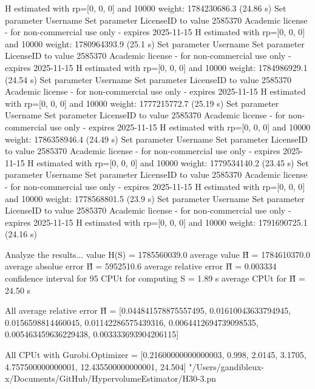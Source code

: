   H estimated with rp=[0, 0, 0] and 10000 weight:  1784230686.3  (24.86 s)
Set parameter Username
Set parameter LicenseID to value 2585370
Academic license - for non-commercial use only - expires 2025-11-15
  H estimated with rp=[0, 0, 0] and 10000 weight:  1780964393.9  (25.1 s)
Set parameter Username
Set parameter LicenseID to value 2585370
Academic license - for non-commercial use only - expires 2025-11-15
  H estimated with rp=[0, 0, 0] and 10000 weight:  1784986929.1  (24.54 s)
Set parameter Username
Set parameter LicenseID to value 2585370
Academic license - for non-commercial use only - expires 2025-11-15
  H estimated with rp=[0, 0, 0] and 10000 weight:  1777215772.7  (25.19 s)
Set parameter Username
Set parameter LicenseID to value 2585370
Academic license - for non-commercial use only - expires 2025-11-15
  H estimated with rp=[0, 0, 0] and 10000 weight:  1786358946.4  (24.49 s)
Set parameter Username
Set parameter LicenseID to value 2585370
Academic license - for non-commercial use only - expires 2025-11-15
  H estimated with rp=[0, 0, 0] and 10000 weight:  1779534140.2  (23.45 s)
Set parameter Username
Set parameter LicenseID to value 2585370
Academic license - for non-commercial use only - expires 2025-11-15
  H estimated with rp=[0, 0, 0] and 10000 weight:  1778568801.5  (23.9 s)
Set parameter Username
Set parameter LicenseID to value 2585370
Academic license - for non-commercial use only - expires 2025-11-15
  H estimated with rp=[0, 0, 0] and 10000 weight:  1791690725.1  (24.16 s)

Analyze the results...
  value H(S)                  = 1785560039.0 
  average value H̃             = 1784610370.0 
  average absolue error H̃     = 5952510.6 
  average relative error H̃    = 0.003334 
  confidence interval for 95%
  CPUt for computing S         = 1.89 s
  average CPUt for H̃           = 24.50 s

All average relative error H̃ = [0.044841578875557495, 0.01610043633794945, 0.0156598814460045, 0.01142286575439316, 0.0064412694739098535, 0.005463459636229438, 0.003333693904206115]

All CPUt with Gurobi.Optimizer = [0.21600000000000003, 0.998, 2.0145, 3.1705, 4.757500000000001, 12.435500000000001, 24.504]
"/Users/gandibleux-x/Documents/GitHub/HypervolumeEstimator/H30-3.pn